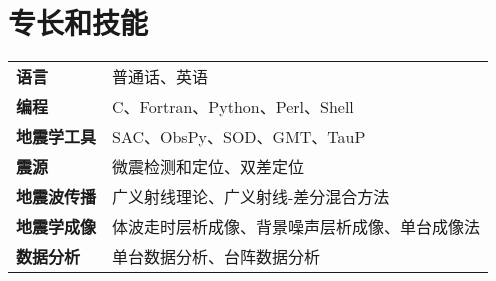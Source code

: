 \section*{专长和技能}

\begin{tabular}{p{} p{}}
\textbf{语言} & 普通话、英语 \\
\textbf{编程} & C、Fortran、Python、Perl、Shell \\
\textbf{地震学工具} & SAC、ObsPy、SOD、GMT、TauP \\
\textbf{震源} & 微震检测和定位、双差定位 \\
\textbf{地震波传播} & 广义射线理论、广义射线-差分混合方法 \\
\textbf{地震学成像} & 体波走时层析成像、背景噪声层析成像、单台成像法 \\
\textbf{数据分析} & 单台数据分析、台阵数据分析 \\
\end{tabular}
